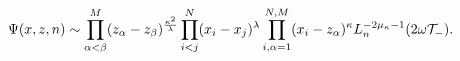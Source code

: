 \begin{equation}
	\Psi(x,z,n)\sim \prod_{\alpha < \beta}^{M} 
	 (z_{\alpha}-z_{\beta})^{\frac{\kappa^2}{\lambda}}
	\prod_{i < j}^{N} (x_{i}-x_{j})^{\lambda}
	\prod_{i,\alpha=1}^{N,M} (x_{i}-z_{\alpha})^{\kappa}
	L_{n}^{-2\mu_{\kappa}-1}(2\omega{\cal T}_{-}) .
\end{equation}

